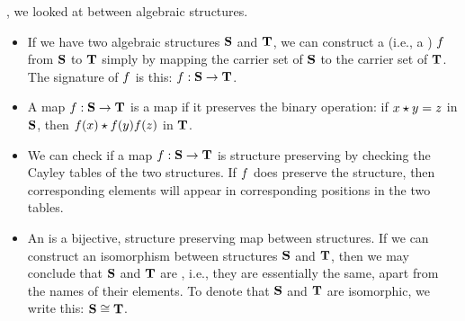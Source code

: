 \documentclass[../../../main.tex]{subfiles}
\begin{document}
, we looked at  between algebraic structures.

\begin{itemize}

  \item If we have two algebraic structures $\mathbf{S}$ and $\mathbf{T}$, we can construct a  (i.e., a ) $f$ from $\mathbf{S}$ to $\mathbf{T}$ simply by mapping the carrier set of $\mathbf{S}$ to the carrier set of $\mathbf{T}$. The signature of $f$ is this: $f: \mathbf{S} \rightarrow \mathbf{T}$.
  
  \item A map $f: \mathbf{S} \rightarrow \mathbf{T}$ is a  map if it preserves the binary operation: if $\op{x}{y} = z$ in $\mathbf{S}$, then $\op{\func{f}(x)}{\func{f}(y)} \func{f}(z)$ in $\mathbf{T}$.

  \item We can check if a map $f: \mathbf{S} \rightarrow \mathbf{T}$ is structure preserving by checking the Cayley tables of the two structures. If $f$ does preserve the structure, then corresponding elements will appear in corresponding positions in the two tables.
  
  \item An  is a bijective, structure preserving map between structures. If we can construct an isomorphism between structures $\mathbf{S}$ and $\mathbf{T}$, then we may conclude that $\mathbf{S}$ and $\mathbf{T}$ are , i.e., they are essentially the same, apart from the names of their elements. To denote that $\mathbf{S}$ and $\mathbf{T}$ are isomorphic, we write this: $\algebra{S} \isomorphic/ \algebra{T}$.

\end{itemize}
\end{document}
